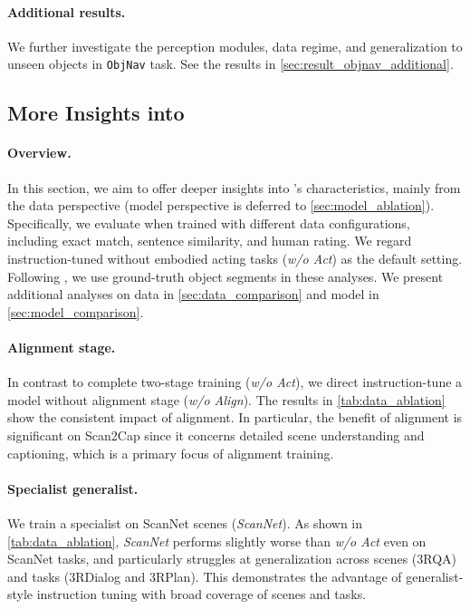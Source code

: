 \documentclass{article}
\begin{document}
\paragraph{Additional results.} We further investigate the perception modules, data regime, and generalization to unseen objects in \texttt{ObjNav} task. See the results in \cref{sec:result_objnav_additional}.



\vskip -0.15in
\subsection{More Insights into \agent}\label{sec:ablation}

\paragraph{Overview.} In this section, we aim to offer deeper insights into \agent's characteristics, mainly from the data perspective (model perspective is deferred to \cref{sec:model_ablation}). Specifically, we evaluate \agent when trained with different data configurations, including exact match, sentence similarity, and human rating. We regard \agent instruction-tuned without embodied acting tasks (\textit{w/o Act}) as the default setting. Following \citet{achlioptas2020referit3d}, we use ground-truth object segments in these analyses. We present additional analyses on data in \cref{sec:data_comparison} and model in \cref{sec:model_comparison}.

\paragraph{Alignment stage.} In contrast to complete two-stage training (\textit{w/o Act}), we direct instruction-tune a model without alignment stage (\textit{w/o Align}). The results in \cref{tab:data_ablation} show the consistent impact of alignment. In particular, the benefit of alignment is significant on Scan2Cap since it concerns detailed scene understanding and captioning, which is a primary focus of alignment training. %

\paragraph{Specialist \vs generalist.} We train a specialist on ScanNet scenes (\textit{ScanNet}). As shown in \cref{tab:data_ablation}, \textit{ScanNet} performs slightly worse than \textit{w/o Act} even on ScanNet tasks, and particularly struggles at generalization across scenes (3RQA) and tasks (3RDialog and 3RPlan). This demonstrates the advantage of generalist-style instruction tuning with broad coverage of scenes and tasks.
\end{document}
